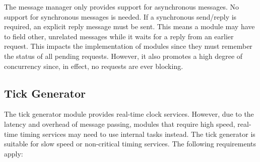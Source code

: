 The message manager only provides support for asynchronous messages. No support for synchronous
messages is needed. If a synchronous send/reply is required, an explicit reply message must be
sent. This means a module may have to field other, unrelated messages while it waits for a reply
from an earlier request. This impacts the implementation of modules since they must remember the
status of all pending requests.  However, it also promotes a high degree of concurrency since, in effect, no requests
are ever blocking.

\subsection{Tick Generator}
\label{sec:tick-generator}

The tick generator module provides real-time clock services. However, due to the latency and
overhead of message passing, modules that require high speed, real-time timing services may need
to use internal tasks instead. The tick generator is suitable for slow speed or non-critical
timing services.  The following requirements apply:

